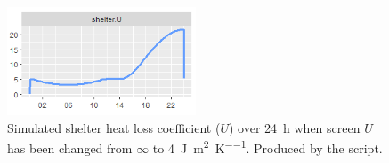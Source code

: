 \begin{figure} [hb]
\centering
\includegraphics[width=0.5\textwidth]{graphics/vg/construction-screen-u}
\caption{Simulated shelter heat loss coefficient ($U$) over \SI{24}{\hour} when screen $U$ has been changed from $\infty$ to \SI{4}{\joule\per\meter\squared\per\kelvin}. Produced by the  script.}
\label{fig:vg-construction-screen-u}
\end{figure}
